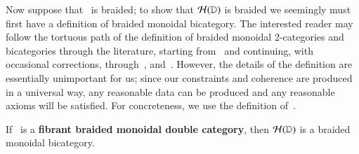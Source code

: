 \documentclass{amsart}
\begin{document}
  Now suppose that \lD\ is braided; to show that $\mathcal{H}(\mathbb{D})$ is braided
  we seemingly must first have a definition of braided monoidal
  bicategory.  The interested reader may follow the tortuous path of
  the definition of braided monoidal 2-categories and bicategories
  through the literature, starting from~\cite{kv:2cat-zam,kv:bm2cat}
  and continuing, with occasional corrections,
  through~\cite{bn:hda-i,ds:monbi-hopfagbd,crans:centers,mccrudden:bal-coalgb},
  and~\cite{gurski:brmonbicat}.  However, the details of the
  definition are essentially unimportant for us; since our constraints
  and coherence are produced in a universal way, any reasonable data
  can be produced and any reasonable axioms will be satisfied.  For
  concreteness, we use the definition of~\cite{mccrudden:bal-coalgb}.

\begin{lem}\label{thm:br11-brbi}
  If \lD\ is a {\bf fibrant braided monoidal double category}, then $\mathcal{H}(\mathbb{D})$ is a
 braided monoidal bicategory.  
\end{lem}
\end{document}

